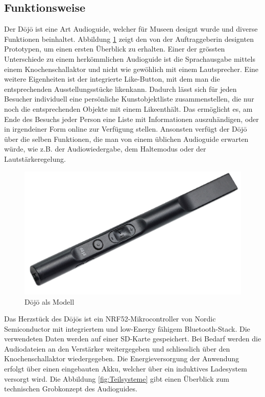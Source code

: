 \subsection{Funktionsweise} \label{sec:funktionsweise}
Der Dōjō ist eine Art Audioguide, welcher für Museen designt wurde und diverse Funktionen beinhaltet. Abbildung \ref{fig:Funktion Dojo} zeigt den von der Auftraggeberin designten Prototypen, um einen ersten Überblick zu erhalten. Einer der grössten Unterschiede zu einem herkömmlichen Audioguide ist die Sprachausgabe mittels einem Knochenschallaktor und nicht wie gewöhlich mit einem Lautsprecher. Eine weitere Eigenheiten ist der integrierte \glqq Like\grqq-Button, mit dem man die entsprechenden Ausstellungsstücke \glqq liken\grqq kann. Dadurch lässt sich für jeden Besucher individuell eine persönliche Kunstobjektliste zusammenstellen, die nur noch die entsprechenden Objekte mit einem \glqq Like\grqq enthält. Das ermöglicht es, am Ende des Besuchs jeder Person eine Liste mit Informationen auszuhändigen, oder in irgendeiner Form online zur Verfügung stellen. Ansonsten verfügt der Dōjō über die selben Funktionen, die man von einem üblichen Audioguide erwarten würde, wie z.B. der Audiowiedergabe, dem Haltemodus oder der Lautstärkeregelung.

\begin{figure}[H]
	\begin{center}
		\includegraphics[width=140mm]{data/Dojo.png}
		\caption[Dōjō als Modell]{Dōjō als Modell} %
		\label{fig:Funktion Dojo}
	\end{center}
\end{figure}

Das Herzstück des Dōjōs ist ein NRF52-Mikrocontroller von Nordic Semiconductor mit integriertem und low-Energy fähigem Bluetooth-Stack. Die verwendeten Daten werden auf einer SD-Karte gespeichert. Bei Bedarf werden die Audiodateien an den Verstärker weitergegeben und schliesslich über den Knochenschallaktor wiedergegeben. Die Energieversorgung der Anwendung erfolgt über einen eingebauten Akku, welcher über ein induktives Ladesystem versorgt wird. Die Abbildung \ref{fig:Teilsysteme} gibt einen Überblick zum technischen Grobkonzept des Audioguides.


